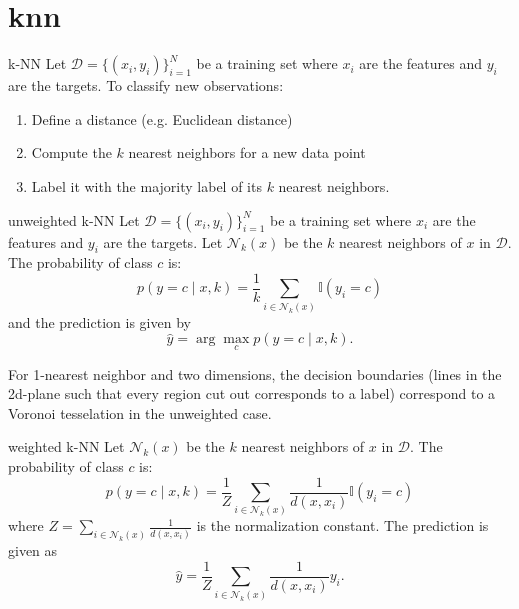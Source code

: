 \section{knn}


\begin{Construction}{k-NN}
    Let $ \mathcal{ D } = \{ ( x_i , y_i ) \}_{ i = 1 }^N $ be a training set where $ x_i $ are the features and $ y_i $ are the targets.
    To classify new observations:
    \begin{enumerate}
        \item 
        Define a distance (e.g. Euclidean distance) 

        \item 
        Compute the $ k $ nearest neighbors for a new data point

        \item 
        Label it with the majority label of its $ k $ nearest neighbors.
    \end{enumerate}
\end{Construction}

\begin{defi}{unweighted k-NN}
    Let $ \mathcal{ D } = \{ ( x_i , y_i ) \}_{ i = 1 }^N $ be a training set where $ x_i $ are the features and $ y_i $ are the targets.
    Let $ \mathcal{ N }_k ( x ) $ be the $ k $ nearest neighbors of $ x $ in $ \mathcal{ D } $.
    The probability of class $ c $ is:
    \[
        p ( y = c \mid x , k ) 
        = 
        \frac{ 1 }{ k } \sum_{ i \in \mathcal{ N }_k ( x ) } \mathbb{ I } ( y_i = c ) 
    \]
    and the prediction is given by 
    \[
        \widehat{ y } 
        = 
        \arg \max_c p ( y = c \mid x , k ).
    \]
\end{defi}

\begin{rmk}
    For 1-nearest neighbor and two dimensions, the decision boundaries (lines in the 2d-plane such that every region cut out corresponds to a label) correspond to a Voronoi tesselation in the unweighted case.
\end{rmk}

\begin{defi}{weighted k-NN}
    Let $ \mathcal{ N }_k ( x ) $ be the $ k $ nearest neighbors of $ x $ in $ \mathcal{ D } $.
    The probability of class $ c $ is:
    \[
        p ( y = c \mid x , k ) 
        = 
        \frac{ 1 }{ Z } \sum_{ i \in \mathcal{ N }_k ( x ) }
        \frac{ 1 }{ d ( x , x_i ) } \mathbb{ I } ( y_i = c )
    \]
    where $ Z = \sum_{ i \in \mathcal{ N }_k ( x ) } \frac{ 1 }{ d ( x , x_i ) } $ is the normalization constant.
    The prediction is given as 
    \[
        \widehat{ y } 
        = 
        \frac{ 1 }{ Z }
        \sum_{ i \in \mathcal{ N }_k ( x ) } \frac{ 1 }{ d ( x , x_i ) } y_i.
    \]
\end{defi}

